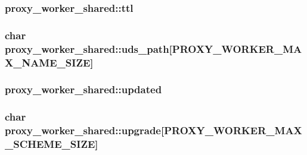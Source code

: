 \subsubsection[{\texorpdfstring{ttl}{ttl}}]{ proxy\+\_\+worker\+\_\+shared\+::ttl}\hypertarget{structproxy__worker__shared_a010c0f9eeb08efe37451b903824f3da0}{}\label{structproxy__worker__shared_a010c0f9eeb08efe37451b903824f3da0}
\subsubsection[{\texorpdfstring{uds\+\_\+path}{uds_path}}]{\setlength{\rightskip}{0pt plus 5cm}char proxy\+\_\+worker\+\_\+shared\+::uds\+\_\+path\mbox{[}{\bf P\+R\+O\+X\+Y\+\_\+\+W\+O\+R\+K\+E\+R\+\_\+\+M\+A\+X\+\_\+\+N\+A\+M\+E\+\_\+\+S\+I\+ZE}\mbox{]}}\hypertarget{structproxy__worker__shared_a2a079addb146a66a1246eb8518b7b299}{}\label{structproxy__worker__shared_a2a079addb146a66a1246eb8518b7b299}
\subsubsection[{\texorpdfstring{updated}{updated}}]{ proxy\+\_\+worker\+\_\+shared\+::updated}\hypertarget{structproxy__worker__shared_a265cad9ad9c23ea321536f675343a076}{}\label{structproxy__worker__shared_a265cad9ad9c23ea321536f675343a076}
\subsubsection[{\texorpdfstring{upgrade}{upgrade}}]{\setlength{\rightskip}{0pt plus 5cm}char proxy\+\_\+worker\+\_\+shared\+::upgrade\mbox{[}{\bf P\+R\+O\+X\+Y\+\_\+\+W\+O\+R\+K\+E\+R\+\_\+\+M\+A\+X\+\_\+\+S\+C\+H\+E\+M\+E\+\_\+\+S\+I\+ZE}\mbox{]}}\hypertarget{structproxy__worker__shared_a8ee12c9fa2ba8cc4e7def393fb6ce023}{}\label{structproxy__worker__shared_a8ee12c9fa2ba8cc4e7def393fb6ce023}
